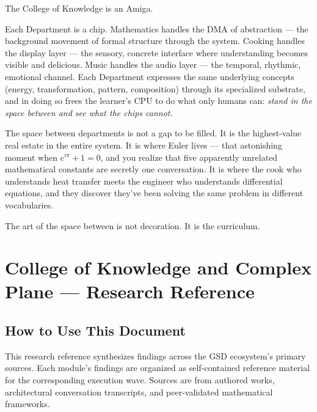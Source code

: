 \documentclass[11pt,letterpaper]{article}
\newcommand{\stageheader}[2]{%
  \noindent\colorbox{#2}{\makebox[\textwidth][l]{%
    \textcolor{white}{\bfseries\sffamily\hspace{6pt}#1\hspace{6pt}}}}%
  \vspace{0.5em}\par%
}
\begin{document}
The College of Knowledge is an Amiga.

Each Department is a chip. Mathematics handles the DMA of abstraction --- the background movement
of formal structure through the system. Cooking handles the display layer --- the sensory, concrete
interface where understanding becomes visible and delicious. Music handles the audio layer --- the
temporal, rhythmic, emotional channel. Each Department expresses the same underlying concepts
(energy, transformation, pattern, composition) through its specialized substrate, and in doing so
frees the learner's CPU to do what only humans can: \textit{stand in the space between and see
what the chips cannot.}

The space between departments is not a gap to be filled. It is the highest-value real estate in
the entire system. It is where Euler lives --- that astonishing moment when $e^{i\pi} + 1 = 0$,
and you realize that five apparently unrelated mathematical constants are secretly one conversation.
It is where the cook who understands heat transfer meets the engineer who understands differential
equations, and they discover they've been solving the same problem in different vocabularies.

The art of the space between is not decoration. It is the curriculum.

\newpage

\stageheader{STAGE 2 --- RESEARCH REFERENCE}{secondary}

\section{College of Knowledge and Complex Plane --- Research Reference}

\subsection{How to Use This Document}

This research reference synthesizes findings across the GSD ecosystem's primary sources. Each
module's findings are organized as self-contained reference material for the corresponding
execution wave. Sources are from authored works, architectural conversation transcripts, and
peer-validated mathematical frameworks.
\end{document}
